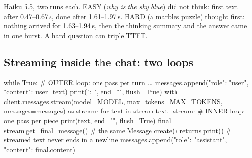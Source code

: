 \begin{center}
\end{center}

\begin{lab}
Haiku 5.5, two runs each. EASY (\emph{why is the sky blue}) did not think: first text after
0.47--0.67\,s, done after 1.61--1.97\,s. HARD (a marbles puzzle) thought first: nothing arrived for
1.63--1.94\,s, then the thinking summary and the answer came in one burst. A hard question can
triple TTFT.
\end{lab}

\subsection{Streaming inside the chat: two loops}

\begin{pycode}
while True:                                       # OUTER loop: one pass per turn
    ...
    messages.append({"role": "user", "content": user_text})
    print("\nClaude: ", end="", flush=True)
    with client.messages.stream(model=MODEL, max_tokens=MAX_TOKENS,
                                messages=messages) as stream:
        for text in stream.text_stream:           # INNER loop: one pass per piece
            print(text, end="", flush=True)
        final = stream.get_final_message()        # the same Message create() returns
    print()                                       # streamed text never ends in a newline
    messages.append({"role": "assistant", "content": final.content})
\end{pycode}

